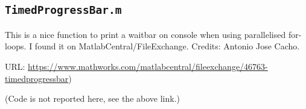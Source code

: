 \documentclass[12pt,A4,titlepage]{article}
\begin{document}
\subsection*{\texttt{TimedProgressBar.m}}

This is a nice function to print a waitbar on console when using parallelised for-loops. I found it on MatlabCentral/FileExchange. Credits:  Antonio Jose Cacho.

URL: \url{https://www.mathworks.com/matlabcentral/fileexchange/46763-timedprogressbar})

(Code is not reported here, see the above link.)
\end{document}
